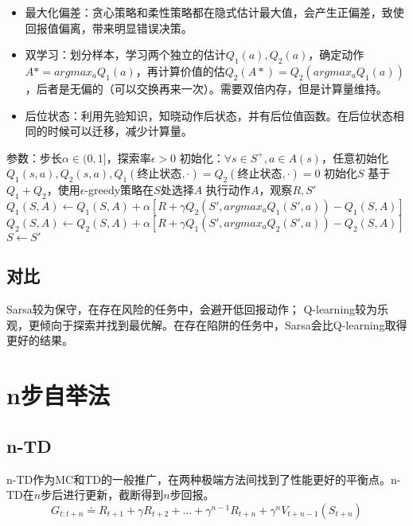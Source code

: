 \documentclass[
12pt, %
a4paper, 
oneside, %
headinclude,footinclude, %
]{scrartcl}
\begin{document}
\begin{itemize}
\item 最大化偏差：贪心策略和柔性策略都在隐式估计最大值，会产生正偏差，致使回报值偏离，带来明显错误决策。
\item 双学习：划分样本，学习两个独立的估计$ Q_1(a),Q_2(a) $，确定动作$ A* = argmax_a Q_1(a) $，再计算价值的估$ Q_2(A*) = Q_2(argmax_a Q_1(a)) $，后者是无偏的（可以交换再来一次）。需要双倍内存，但是计算量维持。
\item 后位状态：利用先验知识，知晓动作后状态，并有后位值函数。在后位状态相同的时候可以迁移，减少计算量。
\end{itemize}
\begin{myalgorithm}[双Q-learning]
\State 参数：步长$ \alpha \in (0,1] $，探索率$ \epsilon > 0 $
\State 初始化：$ \forall s \in S^+, a \in A(s) $，任意初始化$ Q_1(s,a),Q_2(s,a), Q_1(\text{终止状态}, \cdot) = Q_2(\text{终止状态}, \cdot) = 0 $
\State 初始化$ S $
\State 基于$ Q_1 + Q_2 $，使用$ \epsilon $-greedy策略在$ S $处选择$ A $
\State 执行动作$ A $，观察$ R,S' $
\State $ Q_1(S, A) \gets Q_1(S, A) + \alpha [R + \gamma Q_2(S', argmax_a Q_1(S',a)) - Q_1(S, A)] $
\Else
\State $ Q_2(S, A) \gets Q_2(S, A) + \alpha [R + \gamma Q_1(S', argmax_a Q_2(S',a)) - Q_2(S, A)] $
\EndIf
\State $ S \gets S' $
\EndWhile
\EndFor
\end{myalgorithm}
\subsection{对比}
Sarsa较为保守，在存在风险的任务中，会避开低回报动作； Q-learning较为乐观，更倾向于探索并找到最优解。在存在陷阱的任务中，Sarsa会比Q-learning取得更好的结果。
\section{n步自举法}
\subsection{n-TD}
n-TD作为MC和TD的一般推广，在两种极端方法间找到了性能更好的平衡点。n-TD在$ n $步后进行更新，截断得到$ n $步回报。
$$ G_{t:t + n} \doteq R_{t + 1} + \gamma R_{t + 2} + \dots + \gamma^{n - 1} R_{t + n} + \gamma^n V_{t + n - 1}(S_{t + n}) $$
\end{document}

